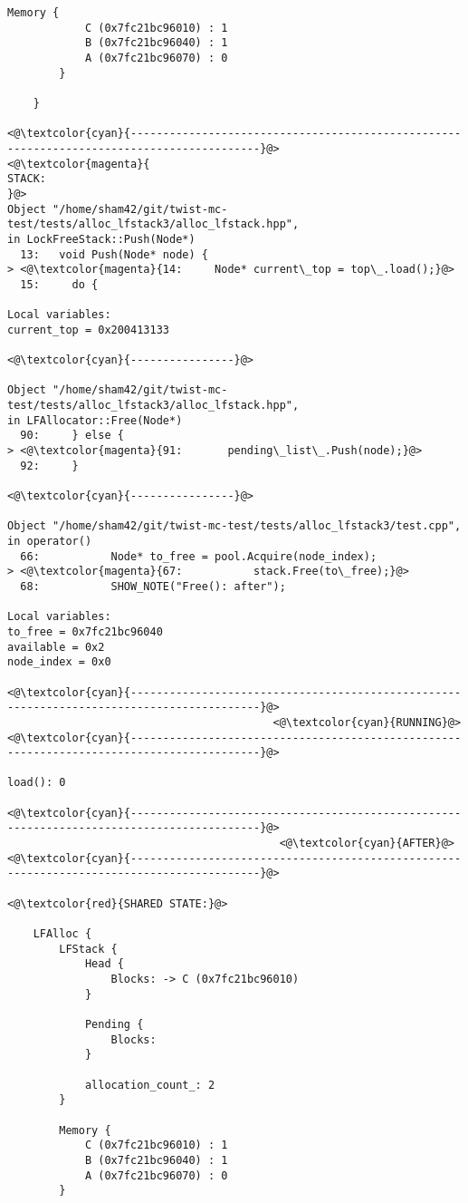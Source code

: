 \begin{adjustwidth}{-3.3cm}{-1cm}
\begin{allintypewriter}
\begin{multicols*}{2}
\begin{lstlisting}[numbers=none]
	    Memory {
		    C (0x7fc21bc96010) : 1
		    B (0x7fc21bc96040) : 1
		    A (0x7fc21bc96070) : 0
	    }

    }

<@\textcolor{cyan}{------------------------------------------------------------------------------------------}@>
<@\textcolor{magenta}{
STACK:
}@>
Object "/home/sham42/git/twist-mc-test/tests/alloc_lfstack3/alloc_lfstack.hpp",
in LockFreeStack::Push(Node*)
  13:   void Push(Node* node) {
> <@\textcolor{magenta}{14:     Node* current\_top = top\_.load();}@>
  15:     do {

Local variables: 
current_top = 0x200413133

<@\textcolor{cyan}{----------------}@>

Object "/home/sham42/git/twist-mc-test/tests/alloc_lfstack3/alloc_lfstack.hpp",
in LFAllocator::Free(Node*)
  90:     } else {
> <@\textcolor{magenta}{91:       pending\_list\_.Push(node);}@>
  92:     }

<@\textcolor{cyan}{----------------}@>

Object "/home/sham42/git/twist-mc-test/tests/alloc_lfstack3/test.cpp",
in operator()
  66:           Node* to_free = pool.Acquire(node_index);
> <@\textcolor{magenta}{67:           stack.Free(to\_free);}@>
  68:           SHOW_NOTE("Free(): after");

Local variables: 
to_free = 0x7fc21bc96040
available = 0x2
node_index = 0x0

<@\textcolor{cyan}{------------------------------------------------------------------------------------------}@>
                                         <@\textcolor{cyan}{RUNNING}@>
<@\textcolor{cyan}{------------------------------------------------------------------------------------------}@>

load(): 0

<@\textcolor{cyan}{------------------------------------------------------------------------------------------}@>
                                          <@\textcolor{cyan}{AFTER}@>
<@\textcolor{cyan}{------------------------------------------------------------------------------------------}@>

<@\textcolor{red}{SHARED STATE:}@>

    LFAlloc {
	    LFStack {
		    Head {
			    Blocks: -> C (0x7fc21bc96010) 
		    }

		    Pending {
			    Blocks: 
		    }

		    allocation_count_: 2
	    }

	    Memory {
		    C (0x7fc21bc96010) : 1
		    B (0x7fc21bc96040) : 1
		    A (0x7fc21bc96070) : 0
	    }


\end{lstlisting}
\end{multicols*}
\end{allintypewriter}
\end{adjustwidth}
